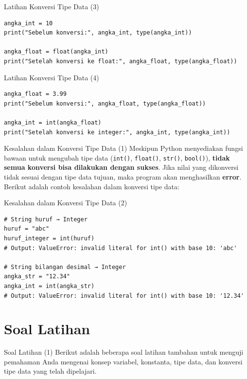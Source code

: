 \documentclass[aspectratio=169, table]{beamer}
\begin{document}
\begin{frame}[fragile]{Latihan Konversi Tipe Data (3)}
\begin{lstlisting}[style=PythonStyle, caption={Kode Python: int_to_float.py}]
angka_int = 10
print("Sebelum konversi:", angka_int, type(angka_int))

angka_float = float(angka_int)
print("Setelah konversi ke float:", angka_float, type(angka_float))
\end{lstlisting}
\end{frame}

\begin{frame}[fragile]{Latihan Konversi Tipe Data (4)}
\begin{lstlisting}[style=PythonStyle, caption={Kode Python: float_to_int.py}]
angka_float = 3.99
print("Sebelum konversi:", angka_float, type(angka_float))

angka_int = int(angka_float)
print("Setelah konversi ke integer:", angka_int, type(angka_int))
\end{lstlisting}
\end{frame}

\begin{frame}[fragile]{Kesalahan dalam Konversi Tipe Data (1)}
Meskipun Python menyediakan fungsi bawaan untuk mengubah tipe data (\texttt{int()}, \texttt{float()}, \texttt{str()}, \texttt{bool()}), \textbf{tidak semua konversi bisa dilakukan dengan sukses}. Jika nilai yang dikonversi tidak sesuai dengan tipe data tujuan, maka program akan menghasilkan \textbf{error}. Berikut adalah contoh kesalahan dalam konversi tipe data:
\end{frame}

\begin{frame}[fragile]{Kesalahan dalam Konversi Tipe Data (2)}
\begin{lstlisting}[style=PythonStyle]
# String huruf → Integer
huruf = "abc"
huruf_integer = int(huruf)  
# Output: ValueError: invalid literal for int() with base 10: 'abc'

# String bilangan desimal → Integer
angka_str = "12.34"
angka_int = int(angka_str)  
# Output: ValueError: invalid literal for int() with base 10: '12.34'
\end{lstlisting}
\end{frame}

\section{Soal Latihan}
\begin{frame}{Soal Latihan (1)}
Berikut adalah beberapa soal latihan tambahan untuk menguji pemahaman Anda mengenai konsep variabel, konstanta, tipe data, dan konversi tipe data yang telah dipelajari.
\end{frame}
\end{document}
